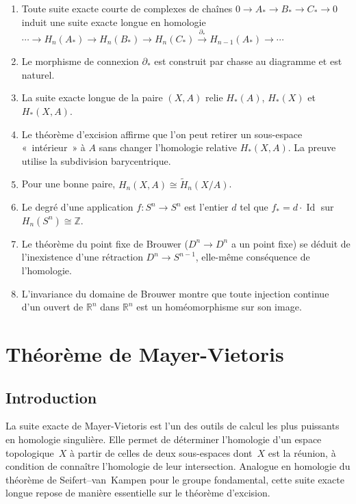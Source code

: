 \documentclass[12pt,a4paper,openany]{book}
\theoremstyle{definition}
\theoremstyle{plain}
\theoremstyle{remark}
\newcommand{\Z}{\mathbb{Z}}
\newcommand{\R}{\mathbb{R}}
\DeclareMathOperator{\Id}{Id}
\begin{document}
\begin{enumerate}[label=\textbf{\arabic*.}]
  \item Toute suite exacte courte de complexes de chaînes
  $0 \to A_* \to B_* \to C_* \to 0$ induit une suite exacte longue en homologie
  $\cdots \to H_n(A_*) \to H_n(B_*) \to H_n(C_*) \xrightarrow{\partial_*} H_{n-1}(A_*) \to \cdots$
  \item Le morphisme de connexion $\partial_*$ est construit par chasse au diagramme et est naturel.
  \item La suite exacte longue de la paire $(X, A)$ relie $H_*(A)$, $H_*(X)$ et $H_*(X,A)$.
  \item Le théorème d'excision affirme que l'on peut retirer un sous-espace «~intérieur~»
  à $A$ sans changer l'homologie relative $H_*(X, A)$. La preuve utilise la subdivision barycentrique.
  \item Pour une bonne paire, $H_n(X, A) \cong \widetilde{H}_n(X/A)$.
  \item Le degré d'une application $f \colon S^n \to S^n$ est l'entier $d$ tel que $f_* = d \cdot \Id$
  sur $H_n(S^n) \cong \Z$.
  \item Le théorème du point fixe de Brouwer ($D^n \to D^n$ a un point fixe) se déduit de
  l'inexistence d'une rétraction $D^n \to S^{n-1}$, elle-même conséquence de l'homologie.
  \item L'invariance du domaine de Brouwer montre que toute injection continue d'un ouvert
  de $\R^n$ dans $\R^n$ est un homéomorphisme sur son image.
\end{enumerate}


\chapter{Théorème de Mayer-Vietoris}\label{ch:mayer-vietoris}

\section*{Introduction}

La suite exacte de Mayer-Vietoris est l'un des
outils de calcul les plus puissants en homologie singulière. Elle permet de déterminer
l'homologie d'un espace topologique~$X$ à partir de celles de deux sous-espaces
dont~$X$ est la réunion, à condition de connaître l'homologie de leur intersection.
Analogue en homologie du théorème de Seifert--van~Kampen
pour le groupe fondamental, cette suite exacte longue repose de manière essentielle sur
le théorème d'excision.
\end{document}
